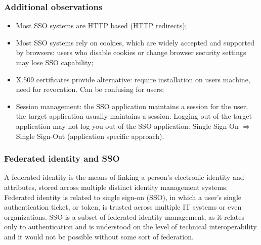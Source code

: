 \documentclass[a4paper, 10pt, titlepage]{article}
\begin{document}
\subsubsection{Additional observations}
\begin{itemize}
\item Most SSO systems are HTTP based (HTTP redirects);
\item Most SSO systems rely on cookies, which are widely accepted and supported by browsers: users who disable cookies or change browser security settings may lose SSO capability;
\item X.509 certificates provide alternative: require installation on users machine, need for revocation. Can be confusing for users;
\item Session management: the SSO application maintains a session for the user, the target application usually maintains a session. Logging out of the target application may not log you out of the SSO application: Single Sign-On $\Rightarrow$ Single Sign-Out (application specific approach).
\end{itemize}

\subsubsection{Federated identity and SSO}
A federated identity is the means of linking a person's electronic identity and attributes, stored across multiple distinct identity management systems. Federated identity is related to single sign-on (SSO), in which a user's single authentication ticket, or token, is trusted across multiple IT systems or even organizations. SSO is a subset of federated identity management, as it relates only to authentication and is understood on the level of technical interoperability and it would not be possible without some sort of federation.
\end{document}
